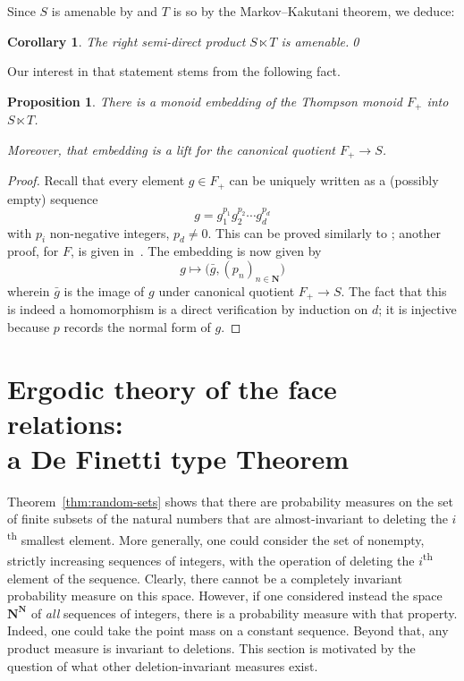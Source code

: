 \documentclass[12pt, pdflatex]{amsart}
\newtheorem{proposition}[theorem]{Proposition}
\newtheorem{corollary}[theorem]{Corollary}
\theoremstyle{definition}
\numberwithin{equation}{section}
\numberwithin{theorem}{section}
\newcommand{\NN}{\mathbf{N}}
\begin{document}
Since $S$ is amenable by  and $T$ is so by the Markov--Kakutani theorem, we deduce:

\begin{corollary}
The right semi-direct product $S\ltimes T$ is amenable.\qed
\end{corollary}

Our interest in that statement stems from the following fact.

\begin{proposition}
There is a monoid embedding of the Thompson monoid $F_+$ into $S\ltimes T$.

Moreover, that embedding is a lift for the canonical quotient $F_+ \to S$.
\end{proposition}

\begin{proof}
Recall that every element $g\in F_+$ can be uniquely written as a (possibly empty) sequence
\begin{equation*}
g = g_1^{p_1} g_2^{p_2} \cdots g_d^{p_d}
\end{equation*}
with $p_i$ non-negative integers, $p_d\neq 0$. This can be proved similarly to ; another proof, for $F$, is given in~\cite[2.7]{Cannon-Floyd-Parry}. The embedding is now given by
\begin{equation*}
g\mapsto \big( \bar g, (p_n)_{n\in\NN} \big)
\end{equation*}
wherein $\bar g$ is the image of $g$ under canonical quotient $F_+ \to S$. The fact that this is indeed a homomorphism is a direct verification by induction on $d$; it is injective because $p$ records the normal form of $g$.
\end{proof}


\section{Ergodic theory of the face relations:\texorpdfstring{\\}{} a De Finetti type Theorem}\label{sec:Finetti}

Theorem~\ref{thm:random-sets} shows that there are probability measures on the set of finite subsets of the natural numbers that are almost-invariant to deleting the $i$\textsuperscript{th} smallest element. More generally, one could consider the set of nonempty, strictly increasing sequences of integers, with the operation of deleting the $i$\textsuperscript{th} element of the sequence. Clearly, there cannot be a completely invariant probability measure on this space. However, if one considered instead the space $\NN^\NN$ of \emph{all} sequences of integers, there is a probability measure with that property. Indeed, one could take the point mass on a constant sequence. Beyond that, any product measure is invariant to deletions. This section is motivated by the question of what other deletion-invariant measures exist.
\end{document}
